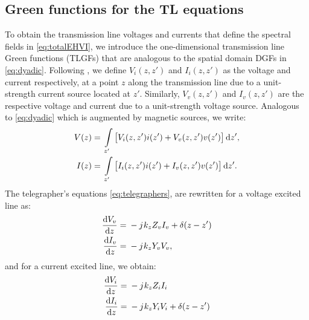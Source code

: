 \subsection{Green functions for the TL equations}
%
To obtain the transmission line voltages and currents that define the spectral fields in \eqref{eq:totalEHVI}, we introduce the one-dimensional transmission line Green functions (TLGFs) that are analogous to the spatial domain DGFs in \eqref{eq:dyadic}. Following \cite{Felsen1994,Michalski2005}, we define $V_i(z,z')$ and $I_i(z,z')$ as the voltage and current respectively, at a point $z$ along the transmission line due to a unit-strength current source located at $z'$. Similarly, $V_v(z,z')$ and $I_v(z,z')$ are the respective voltage and current due to a unit-strength voltage source. Analogous to \eqref{eq:dyadic} which is augmented by magnetic sources, we write:
%
\begin{subequations}
  \begin{align}
    V(z) ={}& \int\limits_{z'} \left[ V_i(z,z') i(z') + V_v(z,z') v(z') \right] \mathop{}\!\mathrm{d}{z'},
    \label{eq:TLGF_V}\\
    I(z) ={}& \int\limits_{z'} \left[ I_i(z,z') i(z') + I_v(z,z') v(z') \right] \mathop{}\!\mathrm{d}{z'}.
    \label{eq:TLGF_I}
  \end{align}
  \label{eq:TLGF_analogy}%
\end{subequations}
%
The telegrapher's equations \eqref{eq:telegraphers}, are rewritten for a voltage excited line as:
%
\begin{subequations}
  \begin{align}
    \dv{V_v}{z} ={}& -{j}\mkern1mu k_z Z_v I_v + \delta(z - z')
    \label{eq:TLGF_V_v}\\
    \dv{I_v}{z} ={}& -{j}\mkern1mu k_z Y_v V_v,
    \label{eq:TLGF_I_v}
  \end{align}
  \label{eq:TLGF_v_telelgraphers}%
\end{subequations}
%
and for a current excited line, we obtain:
%
\begin{subequations}
  \begin{align}
    \dv{V_i}{z} ={}& -{j}\mkern1mu k_z Z_i I_i
    \label{eq:TLGF_V_i}\\
    \dv{I_i}{z} ={}& -{j}\mkern1mu k_z Y_i V_i + \delta(z - z')
    \label{eq:TLGF_I_i}
  \end{align}
  \label{eq:TLGF_i_telelgraphers}%
\end{subequations}
%

